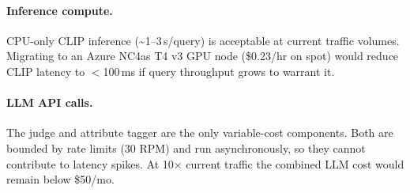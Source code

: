 \documentclass[12pt]{article}
\begin{document}
\paragraph{Inference compute.} CPU-only CLIP inference (\textasciitilde1--3\,s/query) is acceptable at current traffic volumes. Migrating to an Azure NC4as T4 v3 GPU node (\$0.23/hr on spot) would reduce CLIP latency to $<$100\,ms if query throughput grows to warrant it.

\paragraph{LLM API calls.} The judge and attribute tagger are the only variable-cost components. Both are bounded by rate limits (30 RPM) and run asynchronously, so they cannot contribute to latency spikes. At 10$\times$ current traffic the combined LLM cost would remain below \$50/mo.

\end{document}
